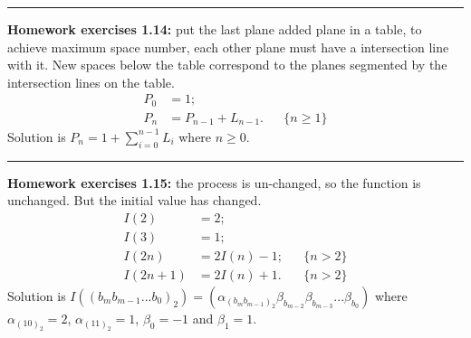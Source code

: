 \documentclass{article}
\begin{document}
\noindent\rule{\textwidth}{0.4pt}
\textbf{Homework exercises 1.14:}
put the last plane added plane in a table, to achieve maximum space number, each other plane must have a intersection line with it.
New spaces below the table correspond to the planes segmented by the intersection lines on the table.
\begin{align}
P_0 &= 1;\\
P_n &= P_{n-1} + L_{n-1}. && \{n\ge1\}
\end{align}
Solution is $P_n = 1 + \sum_{i=0}^{n-1}L_i$ where $n\ge0$.

\noindent\rule{\textwidth}{0.4pt}
\textbf{Homework exercises 1.15:}
the process is un-changed, so the function is unchanged.
But the initial value has changed.
\begin{align}
I(2) &= 2;\\
I(3) &= 1;\\
I(2n) &= 2I(n) - 1; && \{n>2\}\\
I(2n+1) &= 2I(n) + 1. && \{n>2\}
\end{align}
Solution is $I((b_mb_{m-1}...b_0)_2) = (\alpha_{(b_mb_{m-1})_2} \beta_{b_{m-2}}\beta_{b_{m-3}}...\beta_{b_0})$ where $\alpha_{(10)_2} = 2$, $\alpha_{(11)_2} = 1$, $\beta_0 = -1$ and $\beta_1 = 1$.
\end{document}
